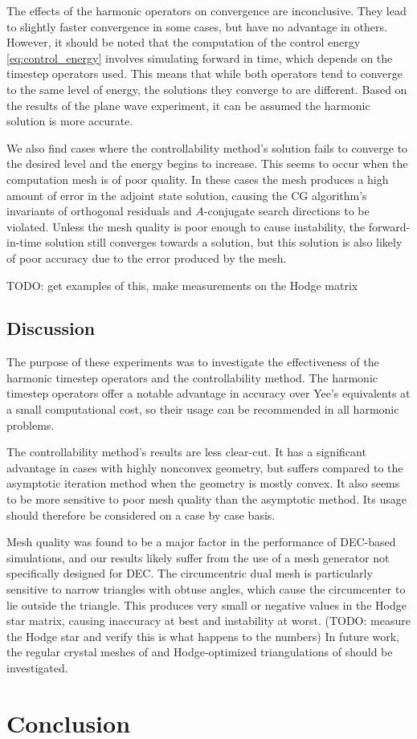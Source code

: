 \documentclass[utf8,english]{gradu3}
\begin{document}
The effects of the harmonic operators on convergence are inconclusive.
They lead to slightly faster convergence in some cases,
but have no advantage in others.
However, it should be noted that the computation
of the control energy \eqref{eq:control_energy}
involves simulating forward in time, which depends on the timestep operators used.
This means that while both operators tend to converge to the same level of energy,
the solutions they converge to are different.
Based on the results of the plane wave experiment,
it can be assumed the harmonic solution is more accurate.

We also find cases where the controllability method's solution
fails to converge to the desired level and the energy begins to increase.
This seems to occur when the computation mesh is of poor quality.
In these cases the mesh produces a high amount of error in the adjoint state solution,
causing the CG algorithm's invariants of orthogonal residuals
and $A$-conjugate search directions to be violated.
Unless the mesh quality is poor enough to cause instability,
the forward-in-time solution still converges
towards a solution, but this solution is also likely of poor accuracy
due to the error produced by the mesh.

TODO: get examples of this, make measurements on the Hodge matrix


\section{Discussion}

The purpose of these experiments was to investigate
the effectiveness of the harmonic time\-step operators
and the controllability method.
The harmonic timestep operators offer a notable advantage in accuracy
over Yee's equivalents at a small computational cost,
so their usage can be recommended in all harmonic problems.

The controllability method's results are less clear-cut.
It has a significant advantage in cases with highly nonconvex geometry,
but suffers compared to the asymptotic iteration method
when the geometry is mostly convex.
It also seems to be more sensitive to poor mesh quality
than the asymptotic method.
Its usage should therefore be considered on a case by case basis.

Mesh quality was found to be a major factor in the performance of DEC-based simulations,
and our results likely suffer from the use of a mesh generator
not specifically designed for DEC.
The circumcentric dual mesh is particularly sensitive to narrow triangles
with obtuse angles, which cause the circumcenter to lie outside the triangle.
This produces very small or negative values
in the Hodge star matrix, causing inaccuracy at best and instability at worst.
(TODO: measure the Hodge star and verify this is what happens to the numbers)
In future work, the regular crystal meshes of \textcite{rabina_numerical_2014}
and Hodge-optimized triangulations of \textcite{mullen_hot_2011} should be investigated.


\chapter{Conclusion}



\hfuzz=4pt
\printbibliography
\hfuzz=0pt
\end{document}

